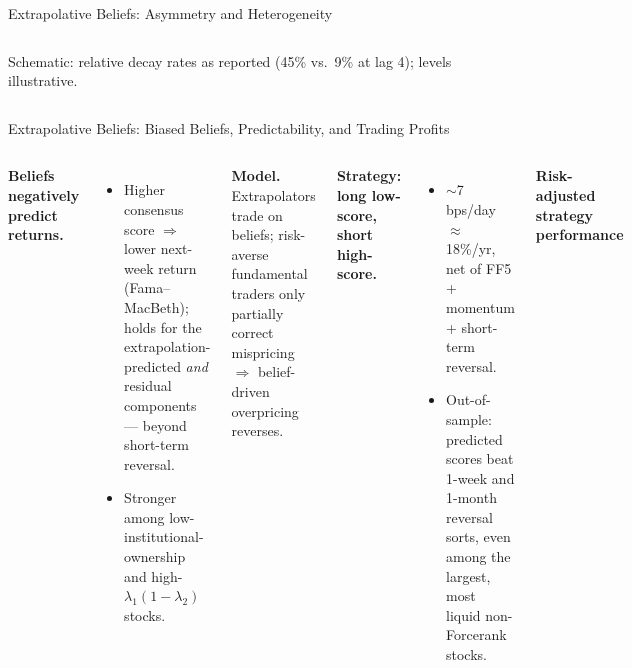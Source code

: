 \documentclass[aspectratio=169, 11pt]{beamer}
\begin{document}
\begin{frame}[shrink=16]{Extrapolative Beliefs: Asymmetry and Heterogeneity}
\begin{columns}[T]
{\scriptsize Schematic: relative decay rates as reported (45\% vs.\ 9\% at lag 4); levels illustrative.}
\end{columns}
\end{frame}

\begin{frame}[shrink=26]{Extrapolative Beliefs: Biased Beliefs, Predictability, and Trading Profits}
\begin{columns}[T]
\textbf{Beliefs negatively predict returns.}
\begin{itemize}
  \item Higher consensus score $\Rightarrow$ lower next-week return (Fama--MacBeth); holds for the extrapolation-predicted \emph{and} residual components --- beyond short-term reversal.
  \item Stronger among low-institutional-ownership and high-$\lambda_1(1-\lambda_2)$ stocks.
\end{itemize}

\vspace{0.5em}
\textbf{Model.} Extrapolators trade on beliefs; risk-averse fundamental traders only partially correct mispricing $\Rightarrow$ belief-driven overpricing reverses.

\vspace{0.5em}
\textbf{Strategy: long low-score, short high-score.}
\begin{itemize}
  \item $\sim$7 bps/day $\approx$ 18\%/yr, net of FF5 + momentum + short-term reversal.
  \item Out-of-sample: predicted scores beat 1-week and 1-month reversal sorts, even among the largest, most liquid non-Forcerank stocks.
\end{itemize}

\centering
\textbf{Risk-adjusted strategy performance}\\[0.3em]


\end{columns}
\end{frame}
\end{document}
